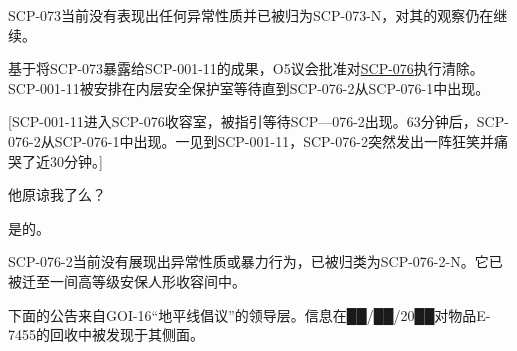 SCP-073当前没有表现出任何异常性质并已被归为SCP-073-N，对其的观察仍在继续。


基于将SCP-073暴露给SCP-001-11的成果，O5议会批准对\hyperref[chap:SCP-076]{SCP-076}执行清除。SCP-001-11被安排在内层安全保护室等待直到SCP-076-2从SCP-076-1中出现。

\begin{scpbox}


{[}SCP-001-11进入SCP-076收容室，被指引等待SCP—076-2出现。63分钟后，SCP-076-2从SCP-076-1中出现。一见到SCP-001-11，SCP-076-2突然发出一阵狂笑并痛哭了近30分钟。]

他原谅我了么？

是的。


\end{scpbox}

SCP-076-2当前没有展现出异常性质或暴力行为，已被归类为SCP-076-2-N。它已被迁至一间高等级安保人形收容间中。




下面的公告来自GOI-16“地平线倡议”的领导层。信息在██\slash ██\slash 20██对物品E-7455的回收中被发现于其侧面。


